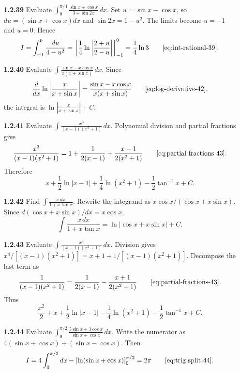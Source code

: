 \begin{enumerate}[label={},leftmargin=0pt]
\begin{enumerate}[label={},leftmargin=0pt,itemsep=9pt]
\setcounter{enumii}{39}
\setcounter{equation}{0}
\item[\textbf{1.2.39}] Evaluate $\displaystyle\int_0^{\pi/4}\frac{\sin x+\cos x}{3+\sin2x}\,dx$.
\solution Set $u=\sin x-\cos x$, so $du=(\sin x+\cos x)dx$ and $\sin2x=1-u^2$. The limits become $u=-1$ and $u=0$. Hence
\[
I=\int_{-1}^{0}\frac{du}{4-u^2}=\left[\frac14\ln\left|\frac{2+u}{2-u}\right|\right]_{-1}^{0}=\frac14\ln3\qquad\eqref{eq:int-rational-39}.
\]

\setcounter{enumii}{40}
\setcounter{equation}{0}
\item[\textbf{1.2.40}] Evaluate $\displaystyle\int\frac{\sin x-x\cos x}{x(x+\sin x)}\,dx$.
\solution Since
\[
\frac{d}{dx}\ln\left|\frac{x}{x+\sin x}\right|=\frac{\sin x-x\cos x}{x(x+\sin x)}\qquad\eqref{eq:log-derivative-42},
\]
the integral is $\ln\left|\frac{x}{x+\sin x}\right|+C$.

\setcounter{enumii}{41}
\setcounter{equation}{0}
\item[\textbf{1.2.41}] Evaluate $\displaystyle\int\frac{x^3}{(x-1)(x^2+1)}\,dx$.
\solution Polynomial division and partial fractions give
\[
\frac{x^3}{(x-1)(x^2+1)}=1+\frac1{2(x-1)}+\frac{x-1}{2(x^2+1)}\qquad\eqref{eq:partial-fractions-43}.
\]
Therefore
\[
x+\frac12\ln|x-1|+\frac14\ln(x^2+1)-\frac12\tan^{-1}x+C.
\]

\setcounter{enumii}{42}
\setcounter{equation}{0}
\item[\textbf{1.2.42}] Find $\displaystyle\int\frac{x\,dx}{1+x\tan x}$.
\solution Rewrite the integrand as $x\cos x/(\cos x+x\sin x)$. Since $d(\cos x+x\sin x)/dx=x\cos x$,
\[
\int\frac{x\,dx}{1+x\tan x}=\ln|\cos x+x\sin x|+C.
\]

\setcounter{enumii}{43}
\setcounter{equation}{0}
\item[\textbf{1.2.43}] Evaluate $\displaystyle\int\frac{x^4}{(x-1)(x^2+1)}\,dx$.
\solution Division gives $x^4/[(x-1)(x^2+1)]=x+1+1/[(x-1)(x^2+1)]$. Decompose the last term as
\[
\frac1{(x-1)(x^2+1)}=\frac1{2(x-1)}-\frac{x+1}{2(x^2+1)}\qquad\eqref{eq:partial-fractions-43}.
\]
Thus
\[
\frac{x^2}{2}+x+\frac12\ln|x-1|-\frac14\ln(x^2+1)-\frac12\tan^{-1}x+C.
\]

\setcounter{enumii}{44}
\setcounter{equation}{0}
\item[\textbf{1.2.44}] Evaluate $\displaystyle\int_0^{\pi/2}\frac{5\sin x+3\cos x}{\sin x+\cos x}\,dx$.
\solution Write the numerator as $4(\sin x+\cos x)+(\sin x-\cos x)$. Then
\[
I=4\int_0^{\pi/2}dx-\left[\ln(\sin x+\cos x)\right]_0^{\pi/2}=2\pi\qquad\eqref{eq:trig-split-44}.
\]


\end{enumerate}
\end{enumerate}
